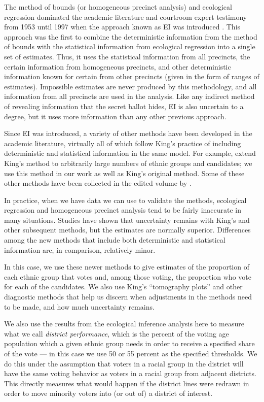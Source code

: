 \documentclass[12pt]{article}
\begin{document}
The method of bounds (or homogeneous precinct analysis) and ecological
regression dominated the academic literature and courtroom expert
testimony from 1953 until 1997 when the approach known as EI was
introduced \citep{King97}. This approach was the first to combine the
deterministic information from the method of bounds with the
statistical information from ecological regression into a single set
of estimates. Thus, it uses the statistical information from all
precincts, the certain information from homogeneous precincts, and
other deterministic information known for certain from other precincts
(given in the form of ranges of estimates).  Impossible estimates are
never produced by this methodology, and all information from all
precincts are used in the analysis. Like any indirect method of
revealing information that the secret ballot hides, EI is also
uncertain to a degree, but it uses more information than any other
previous approach.

Since EI was introduced, a variety of other methods have been
developed in the academic literature, virtually all of which follow
King's practice of including deterministic and statistical information
in the same model.  For example, \citet{RosJiaKin01} extend King's
method to arbitrarily large numbers of ethnic groups and candidates;
we use this method in our work as well as King's original method. Some
of these other methods have been collected in the edited volume by
\citet{KinRosTan04b}.

In practice, when we have data we can use to validate the methods,
ecological regression and homogeneous precinct analysis tend to be
fairly inaccurate in many situations. Studies have shown that
uncertainty remains with King's and other subsequent methods, but the
estimates are normally superior. Differences among the new methods
that include both deterministic and statistical information are, in
comparison, relatively minor.

In this case, we use these newer methods to give estimates of the
proportion of each ethnic group that votes and, among those voting,
the proportion who vote for each of the candidates. We also use King's
``tomography plots'' and other diagnostic methods that help us discern
when adjustments in the methods need to be made, and how much
uncertainty remains.  

We also use the results from the ecological inference analysis here to
measure what we call \emph{district performance}, which is the percent
of the voting age population which a given ethnic group needs in order
to receive a specified share of the vote --- in this case we use 50 or
55 percent as the specified thresholds. We do this under the
assumption that voters in a racial group in the district will have the
same voting behavior as voters in a racial group from adjacent
districts.  This directly measures what would happen if the district
lines were redrawn in order to move minority voters into (or out of) a
district of interest.
\end{document}
